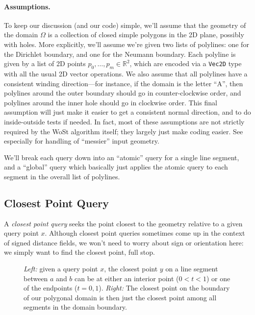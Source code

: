 \documentclass{article}
\newcommand{\figloc}[1]{\textit{#1}}
\newcommand{\code}[1]{\texttt{\small{#1}}}
\renewcommand{\vec}[1]{#1}
\begin{document}
\paragraph{Assumptions.} To keep our discussion (and our code) simple, we'll assume that the geometry of the domain \(\Omega\) is a collection of closed simple polygons in the 2D plane, possibly with holes.  More explicitly, we'll assume we're given two lists of polylines: one for the Dirichlet boundary, and one for the Neumann boundary.  Each polyline is given by a list of 2D points \(\vec{p}_0, \ldots, \vec{p}_m \in \mathbb{R}^2\), which are encoded via a \code{Vec2D} type with all the usual 2D vector operations.  We also assume that all polylines have a consistent winding direction---for instance, if the domain is the letter ``A'', then polylines around the outer boundary should go in counter-clockwise order, and polylines around the inner hole should go in clockwise order.  This final assumption will just make it easier to get a consistent normal direction, and to do inside-outside tests if needed.  In fact, most of these assumptions are not strictly required by the WoSt algorithm itself; they largely just make coding easier.  See especially \citet[Appendix B]{Sawhney:2023:WoSt} for handling of ``messier'' input geometry.

We'll break each query down into an ``atomic'' query for a single line segment, and a ``global'' query which basically just applies the atomic query to each segment in the overall list of polylines.

\subsection{Closest Point Query}
\label{sec:ClosestPointQuery}

A \emph{closest point query} seeks the point closest to the geometry relative to a given query point \(\vec{x}\).  Although closest point queries sometimes come up in the context of signed distance fields, we won't need to worry about sign or orientation here: we simply want to find the closest point, full stop.

\begin{figure}[h!]
   \centering
   
   
   \caption{\figloc{Left:} given a query point \(\vec{x}\), the closest point \(\vec{y}\) on a line segment between \(\vec{a}\) and \(\vec{b}\) can be at either an interior point (\(0 < t < 1\)) or one of the endpoints (\(t=0,1\)). \figloc{Right:} The closest point on the boundary of our polygonal domain is then just the closest point among all segments in the domain boundary.\label{fig:ClosestPointExamples}}
\end{figure}
\end{document}

